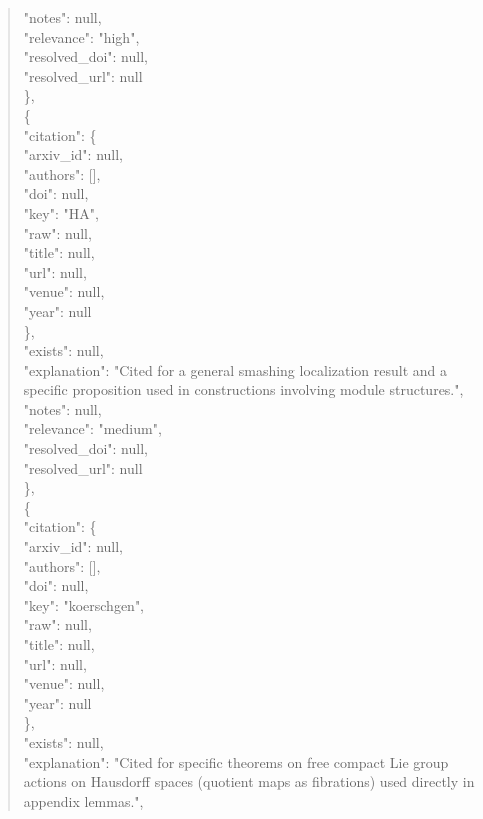 \documentclass[11pt]{article}
\begin{document}
\begin{quote}
      "notes": null,\\
      "relevance": "high",\\
      "resolved\_doi": null,\\
      "resolved\_url": null\\
    \},\\
    \{\\
      "citation": \{\\
        "arxiv\_id": null,\\
        "authors": [],\\
        "doi": null,\\
        "key": "HA",\\
        "raw": null,\\
        "title": null,\\
        "url": null,\\
        "venue": null,\\
        "year": null\\
      \},\\
      "exists": null,\\
      "explanation": "Cited for a general smashing localization result and a specific proposition used in constructions involving module structures.",\\
      "notes": null,\\
      "relevance": "medium",\\
      "resolved\_doi": null,\\
      "resolved\_url": null\\
    \},\\
    \{\\
      "citation": \{\\
        "arxiv\_id": null,\\
        "authors": [],\\
        "doi": null,\\
        "key": "koerschgen",\\
        "raw": null,\\
        "title": null,\\
        "url": null,\\
        "venue": null,\\
        "year": null\\
      \},\\
      "exists": null,\\
      "explanation": "Cited for specific theorems on free compact Lie group actions on Hausdorff spaces (quotient maps as fibrations) used directly in appendix lemmas.",\\

\end{quote}
\end{document}
